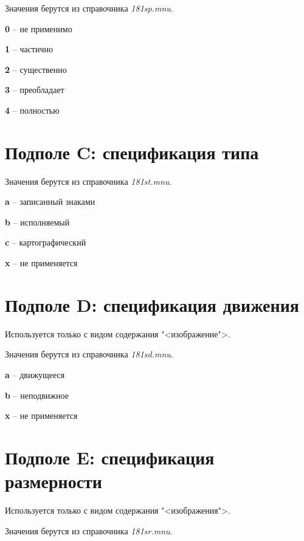 Значения берутся из справочника \emph{181sp.mnu}.

\begin{cutelist}
    \item \textbf{0} -- не применимо
    \item \textbf{1} -- частично
    \item \textbf{2} -- существенно
    \item \textbf{3} -- преобладает
    \item \textbf{4} -- полностью
\end{cutelist}

\section{Подполе C: спецификация типа}

Значения берутся из справочника \emph{181st.mnu}.

\begin{cutelist}
    \item \textbf{a} -- записанный знаками
    \item \textbf{b} -- исполняемый
    \item \textbf{c} -- картографический
    \item \textbf{x} -- не применяется
\end{cutelist}

\section{Подполе D: спецификация движения}

Используется только с видом содержания "<изображение">.

Значения берутся из справочника \emph{181sd.mnu}.

\begin{cutelist}
    \item \textbf{a} -- движущееся
    \item \textbf{b} -- неподвижное
    \item \textbf{x} -- не применяется
\end{cutelist}

\section{Подполе E: спецификация размерности}

Используется только с видом содержания "<изображения">.

Значения берутся из справочника \emph{181sr.mnu}.

